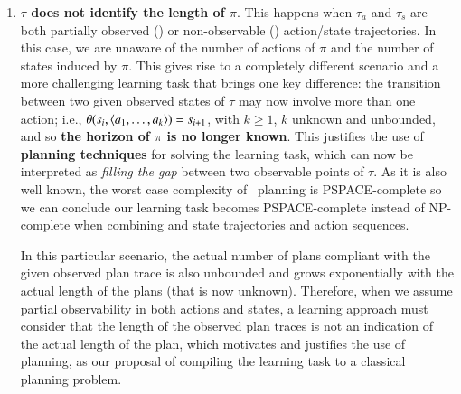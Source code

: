 \begin{enumerate}
\item \textcolor[rgb]{1.00,0.00,0.00}{\textbf{$\tau$ does not identify the length of $\pi$}. This happens when $\tau_a$ and $\tau_s$ are both partially observed (\PO) or non-observable (\NO) action/state trajectories. In this case, we are unaware of the number of actions of $\pi$ and the number of states induced by $\pi$. This gives rise to a completely different scenario and a more challenging learning task that brings one key difference: the transition between two given observed states of $\tau$ may now involve more than one action; i.e., $\theta(s_i,{\langle a_1,\ldots,a_k \rangle})=s_{i+1}$, with $k \geq 1$, $k$ unknown and unbounded, and so \textbf{the horizon of $\pi$ is no longer known}. This justifies the use of \textbf{planning techniques} for solving the learning task, which can now be interpreted as \emph{filling the gap} between two observable points of $\tau$. As it is also well known, the worst case complexity of \strips\ planning is PSPACE-complete so we can conclude our learning task becomes PSPACE-complete instead of NP-complete when combining \PO and \NO state trajectories and action sequences.}

   \textcolor[rgb]{1.00,0.00,0.00}{ In this particular scenario, the actual number of plans compliant with the given observed plan trace is also unbounded and grows exponentially with the actual length of the plans (that is now unknown). Therefore, when we assume partial observability in both actions and states, a learning approach must consider that the length of the observed plan traces is not an indication of the actual length of the plan, which motivates and justifies the use of planning, as our proposal of compiling the learning task to a classical planning problem.}

\end{enumerate}








